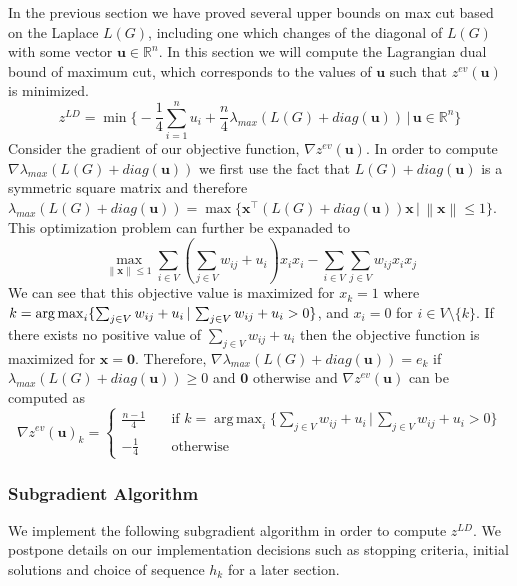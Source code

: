 \documentclass[12pt]{article}
\theoremstyle{plain}
\theoremstyle{definition}
\DeclareMathOperator*{\argmax}{arg\,max}
\newcommand{\norm}[1]{\left\lVert#1\right\rVert}
\begin{document}
In the previous section we have proved several upper bounds on max cut based on the Laplace $L(G)$, including one which changes of the diagonal of $L(G)$ with some vector $\mathbf{u} \in \mathbb{R}^n$. In this section we will
compute the Lagrangian dual bound of maximum cut, which corresponds to the values of $\mathbf{u}$ such that $z^{ev}(\mathbf{u})$ is minimized.
\[
    z^{LD} = \min\Bigg\lbrace -\frac{1}{4}\sum_{i=1}^n u_i + \dfrac{n}{4} \lambda_{max}(L(G) + diag(\mathbf{u})) \,\Bigg|\, \mathbf{u} \in \mathbb{R}^n \Bigg\rbrace
\]
Consider the gradient of our objective function, $\nabla z^{ev}(\mathbf{u})$. In order to compute $\nabla \lambda_{max}(L(G) + diag(\mathbf{u}))$ we first use the fact that $L(G) + diag(\mathbf{u})$ is a symmetric square matrix and therefore $\lambda_{max}(L(G) + diag(\mathbf{u})) = \max\lbrace \mathbf{x}^\top (L(G) + diag(\mathbf{u})) \mathbf{x} \,|\,\norm{\mathbf{x}} \leq 1\rbrace$. This optimization problem can further be expanaded to
\[
\max_{\norm{\mathbf{x}} \leq 1} \sum_{i \in V} \left(\sum_{j \in V} w_{ij} + u_i \right) x_i x_i - \sum_{i \in V} \sum_{j\in V} w_{ij}x_i x_j 
\]
We can see that this objective value is maximized for $x_k = 1$ where $k = \argmax_i\large\lbrace \sum_{j \in V} w_{ij} + u_i \, |\, \sum_{j \in V} w_{ij} + u_i  > 0\large\rbrace$, and $x_i = 0$ for $i \in V \setminus \lbrace k \rbrace$. If there exists no positive value of  $\sum_{j \in V} w_{ij} + u_i $ then the objective function is maximized for $\mathbf{x} = \mathbf{0}$. Therefore, $\nabla \lambda_{max}(L(G) + diag(\mathbf{u})) = e_k$ if $ \lambda_{max}(L(G) + diag(\mathbf{u}))  \geq 0$ and $\mathbf{0}$ otherwise and  $\nabla z^{ev}(\mathbf{u})$ can be computed as
\[
 \nabla z^{ev}(\mathbf{u})_k = \begin{cases}
 \frac{n-1}{4} \quad& \text{if }k =\argmax_i\Big\lbrace \sum_{j \in V} w_{ij} + u_i  \,\Big|\, \sum_{j \in V} w_{ij} + u_i  > 0\Big\rbrace\\
 -\frac{1}{4} \quad&\text{otherwise}
 \end{cases}
\]
\subsubsection{Subgradient Algorithm}\label{subsubsec:Subgradient}

We implement the following subgradient algorithm in order to compute $z^{LD}$. We postpone details on our implementation decisions such as stopping criteria, initial solutions and choice of sequence $h_k$ for a later section.
\end{document}
